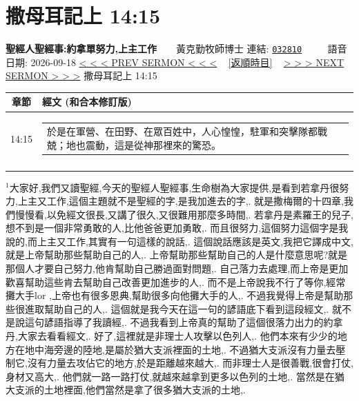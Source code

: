 \documentclass{book}
\begin{document}
\section{撒母耳記上 14:15}
\label{sec:032810}
\textbf{聖經人聖經事:約拿單努力,上主工作}~~~~黃克勤牧師博士
\newline
\newline
連結: \href{http://www.church.com.hk/acms/content.asp?site=cdc\&op=show\&type=product\&code=032810\&layout=sermon}{\texttt{032810}} ~~~~ 語音日期: 2026-09-18
\newline
\newline
\hyperref[sec:032809]{\small{< < < PREV SERMON < < <}}
~
\hyperref[sec:index_chronic]{\small{[返順時目]}}
~
\hyperref[sec:032811]{\small{> > > NEXT SERMON > > >}}
\newline
\newline
撒母耳記上 14:15
\newline
\begin{longtable}{cl}
\hline
\hline
章節 & 經文 (和合本修訂版)\\
\hline
14:15 & \begin{tabularx}{0.7\textwidth}{X} 於是在軍營、在田野、在眾百姓中，人心惶惶，駐軍和突擊隊都戰兢；地也震動，這是從神那裡來的驚恐。 \end{tabularx} \\ \\
[1ex]
\hline
\hline
\end{longtable}
$^{1}$大家好,我們又讀聖經,今天的聖經人聖經事,生命樹為大家提供,是看到若拿丹很努力,上主又工作,這個主題就不是聖經的字,是我加進去的字,.
就是撒梅爾的十四章,我們慢慢看,以免經文很長,又講了很久,又很難用那麼多時間,.
若拿丹是素羅王的兒子,想不到是一個非常勇敢的人,比他爸爸更加勇敢,.
而且很努力,這個努力這個字是我說的,而上主又工作,其實有一句這樣的說話,.
這個說話應該是英文,我把它譯成中文,就是上帝幫助那些幫助自己的人,.
上帝幫助那些幫助自己的人是什麼意思呢?就是那個人才要自己努力,他肯幫助自己勝過面對問題,.
自己落力去處理,而上帝是更加歡喜幫助這些肯去幫助自己改善更加進步的人,.
而不是上帝說我不行了等你,經常攤大手lor ,上帝也有很多恩典,幫助很多向他攤大手的人,.
不過我覺得上帝是幫助那些很進取幫助自己的人,.
這個就是我今天在這一句的諺語底下看到這段經文,.
就不是說這句諺語指導了我讀經,.
不過我看到上帝真的幫助了這個很落力出力的約拿丹,大家去看看經文,.
好了,這裡就是非理士人攻擊以色列人,.
他們本來有少少的地方在地中海旁邊的陸地,是屬於猶大支派裡面的土地,.
不過猶大支派沒有力量去壓制它,沒有力量去攻佔它的地方,於是距離越來越大,.
而非理士人是很善戰,很會打仗,身材又高大,.
他們就一路一路打仗,就越來越拿到更多以色列的土地,.
當然是在猶大支派的土地裡面,他們當然是拿了很多猶大支派的土地,.
\end{document}
